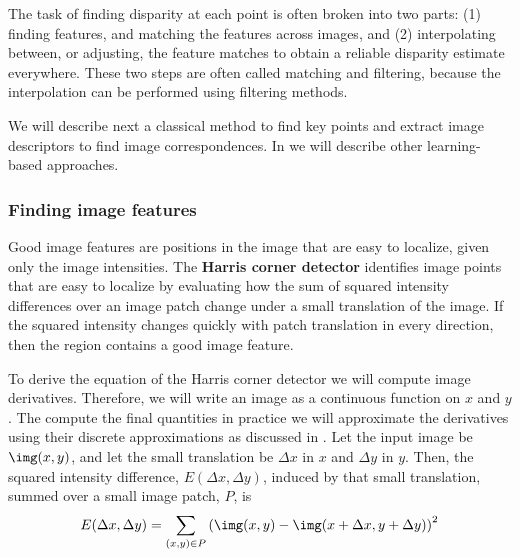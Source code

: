 The task of finding disparity at each point is often broken into two parts:  (1) finding features, and matching the features across images, and (2) interpolating between, or adjusting, the feature matches to obtain a reliable disparity estimate everywhere.
These two steps are often called matching and filtering, because the interpolation can be performed using filtering methods.

We will describe next a classical method to find key points and extract image descriptors to find image correspondences. In \chap{\ref{chapter:3D_multiview}} we will describe other learning-based approaches.

\subsubsection{Finding image features}
\label{sec:finding_image_features}

Good image features are positions in the image that are easy to localize, given only the image intensities. The {\bf Harris corner detector} \cite{Harris88}
identifies image points that are easy to localize by evaluating how the sum of squared intensity differences over an image patch change under a small translation of the image. If the squared intensity changes quickly with patch translation in every direction, then the region contains a good image feature. 

To derive the equation of the Harris corner detector we will compute image derivatives. Therefore, we will write an image as a continuous function on $x$ and $y$. The compute the final quantities in practice we will approximate the derivatives using their discrete approximations as discussed in \chap{\ref{chapter:image_derivatives}}. Let the input image be $\img (x,y)$, and let the small translation be $\Delta x$ in $x$ and $\Delta y$ in $y$.  Then, the squared intensity difference, $E(\Delta x, \Delta y)$, induced by that small translation, summed over a small image patch, $P$, is
\begin{equation}
    E(\Delta x, \Delta y) = \sum_{(x, y) \in P}
    \left( 
    \img(x,y) - \img(x + \Delta x, y + \Delta y) 
    \right)^2
    \label{eq:harris}
\end{equation}

